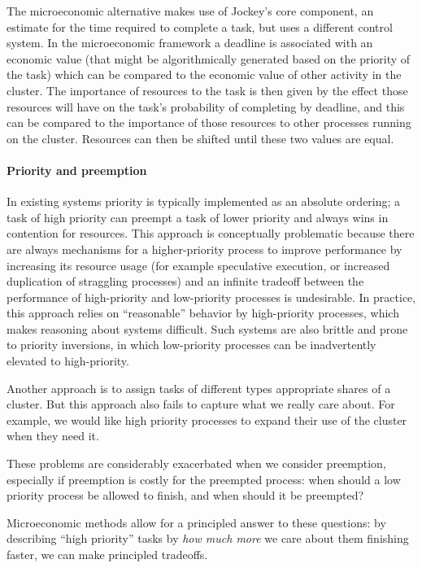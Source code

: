 \documentclass{acm_proc_article-sp}
\begin{document}
The microeconomic alternative makes use of Jockey's core component, an estimate
for the time required to complete a task, but uses a different control system.
In the microeconomic framework a deadline is associated with an economic value
(that might be algorithmically generated based on the priority of the task)
which can be compared to the economic value of other activity in the cluster.
The importance of resources to the task is then given by the effect those
resources will have on the task's probability of completing by deadline, and
this can be compared to the importance of those resources to other processes
running on the cluster. Resources can then be shifted until these two values are
equal.

\paragraph{Priority and preemption} In existing systems priority is typically
implemented as an absolute ordering; a task of high priority can preempt a task
of lower priority and always wins in contention for resources. This approach is
conceptually problematic because there are always mechanisms for a
higher-priority process to improve performance by increasing its resource usage
(for example speculative execution, or increased duplication of straggling
processes) and an infinite tradeoff between the performance of high-priority and
low-priority processes is undesirable. In practice, this approach relies on
``reasonable'' behavior by high-priority processes, which makes reasoning about
systems difficult. Such systems are also brittle and prone to priority
inversions, in which low-priority processes can be inadvertently elevated to
high-priority.

Another approach is to assign tasks of different types appropriate shares of a
cluster. But this approach also fails to capture what we really care about. For
example, we would like high priority processes to expand their use of the
cluster when they need it. 

These problems are considerably exacerbated when we consider preemption,
especially if preemption is costly for the preempted process: when should a low
priority process be allowed to finish, and when should it be preempted?

Microeconomic methods allow for a principled answer to these questions: by
describing ``high priority'' tasks by \emph{how much more} we care about them
finishing faster, we can make principled tradeoffs. 
\end{document}
